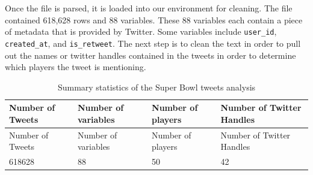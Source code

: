 \documentclass[12pt,twoside]{reedthesis}
\begin{document}
Once the file is parsed, it is loaded into our environment for cleaning.
The file contained 618,628 rows and 88 variables. These 88 variables
each contain a piece of metadata that is provided by Twitter. Some
variables include \texttt{user\_id}, \texttt{created\_at}, and
\texttt{is\_retweet}. The next step is to clean the text in order to
pull out the names or twitter handles contained in the tweets in order
to determine which players the tweet is mentioning.
\begin{longtable}[]{@{}llll@{}}
\caption{\label{tab:sumstat} Summary statistics of the Super Bowl tweets
analysis}\tabularnewline
\toprule
\begin{minipage}[b]{0.20\columnwidth}\raggedright\strut
Number of Tweets\strut
\end{minipage} & \begin{minipage}[b]{0.22\columnwidth}\raggedright\strut
Number of variables\strut
\end{minipage} & \begin{minipage}[b]{0.20\columnwidth}\raggedright\strut
Number of players\strut
\end{minipage} & \begin{minipage}[b]{0.25\columnwidth}\raggedright\strut
Number of Twitter Handles\strut
\end{minipage}\tabularnewline
\midrule
\endfirsthead
\toprule
\begin{minipage}[b]{0.20\columnwidth}\raggedright\strut
Number of Tweets\strut
\end{minipage} & \begin{minipage}[b]{0.22\columnwidth}\raggedright\strut
Number of variables\strut
\end{minipage} & \begin{minipage}[b]{0.20\columnwidth}\raggedright\strut
Number of players\strut
\end{minipage} & \begin{minipage}[b]{0.25\columnwidth}\raggedright\strut
Number of Twitter Handles\strut
\end{minipage}\tabularnewline
\midrule
\endhead
\begin{minipage}[t]{0.20\columnwidth}\raggedright\strut
618628\strut
\end{minipage} & \begin{minipage}[t]{0.22\columnwidth}\raggedright\strut
88\strut
\end{minipage} & \begin{minipage}[t]{0.20\columnwidth}\raggedright\strut
50\strut
\end{minipage} & \begin{minipage}[t]{0.25\columnwidth}\raggedright\strut
42\strut
\end{minipage}\tabularnewline
\bottomrule
\end{longtable}
\end{document}
